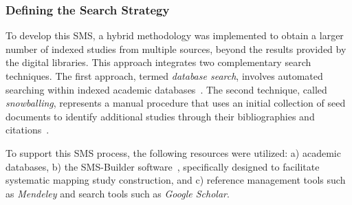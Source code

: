 \subsubsection{Defining the Search Strategy}\label{subsubsec:estrategia-busqueda}

To develop this SMS, a hybrid methodology was implemented to obtain a larger number of indexed studies from multiple sources, beyond the results provided by the digital libraries. This approach integrates two complementary search techniques. The first approach, termed \textit{database search}, involves automated searching within indexed academic databases~\cite{Jalai-01}. The second technique, called \textit{snowballing}, represents a manual procedure that uses an initial collection of seed documents to identify additional studies through their bibliographies and citations~\cite{Jalai-01,Goodman-01}.

To support this SMS process, the following resources were utilized: a) academic databases, b) the SMS-Builder software~\cite{Candela2022100935}, specifically designed to facilitate systematic mapping study construction, and c) reference management tools such as \textit{Mendeley} and search tools such as \textit{Google Scholar}.